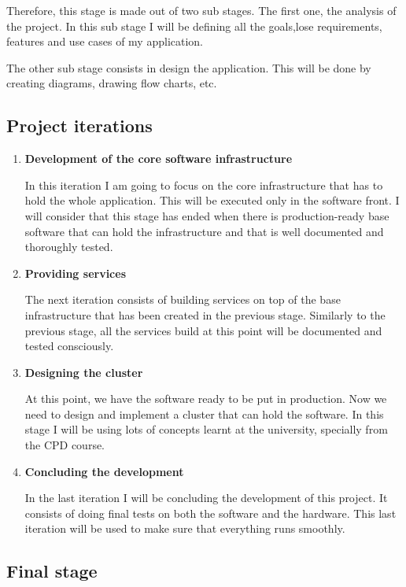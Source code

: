 \documentclass[a4paper,12pt]{article}
\begin{document}
Therefore, this stage is made out of two sub stages. The first one, the
analysis of the project. In this sub stage I will be defining all the goals,lose
requirements, features and use cases of my application.

The other sub stage consists in design the application. This will be done by
creating diagrams, drawing flow charts, etc.

\subsection*{Project iterations}

\begin{enumerate}
 \item {\bf Development of the core software infrastructure}

 In this iteration I am going to focus on the core infrastructure that has to
hold the whole application. This will be executed only in the software front.
I will consider that this stage has ended when there is production-ready base
software that can hold the infrastructure and that is well documented and
thoroughly tested.

 \item {\bf Providing services}

 The next iteration consists of building services on top of the base
infrastructure that has been created in the previous stage. Similarly to the
previous stage, all the services build at this point will be documented and
tested consciously.

  \item {\bf Designing the cluster}

  At this point, we have the software ready to be put in production. Now we
need to design and implement a cluster that can hold the software. In this
stage I will be using lots of concepts learnt at the university, specially from
the CPD course.

  \item {\bf Concluding the development}

  In the last iteration I will be concluding the development of this project.
It consists of doing final tests on both the software and the hardware. This
last iteration will be used to make sure that everything runs smoothly.
\end{enumerate}


\subsection*{Final stage}
\end{document}
